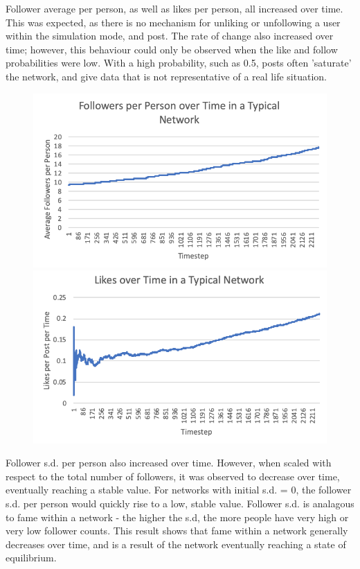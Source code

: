 \documentclass{article}
\begin{document}
Follower average per person, as well as likes per person, all increased over time.
This was expected, as there is no mechanism for unliking or unfollowing a user
within the simulation mode, and post. The rate of change also increased over time;
however, this behaviour could only be observed when the like and follow probabilities
were low. With a high probability, such as 0.5, posts often 'saturate' the network,
and give data that is not representative of a real life situation.
\begin{figure}[H]
\centering
\begin{minipage}{.5\textwidth}
  \centering
  \includegraphics[width=\linewidth]{follAv}
\end{minipage}\hfill
\begin{minipage}{.5\textwidth}
  \centering
  \includegraphics[width=\linewidth]{likes}
\end{minipage}
\end{figure}

Follower s.d. per person also increased over time. However, when scaled with respect
to the total number of followers, it was observed to decrease over time,
eventually reaching a stable value. For networks with initial s.d. = 0,
the follower s.d. per person would quickly rise to a low, stable value.
Follower s.d. is analagous to fame within a network - the higher the s.d,
the more people have very high or very low follower counts.
This result shows that fame within a network generally decreases over time,
and is a result of the network eventually reaching a state of equilibrium.
\end{document}
